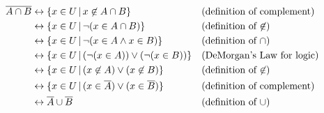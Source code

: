 \begin{solutions}
	\solution\begin{align*}
	\overline{A\cap B} &\leftrightarrow \{x\in U\,|\, x\not\in A\cap B \} &&\text{(definition of complement)}\\
	&\leftrightarrow \{x\in U\,|\, \lnot (x\in A\cap B)\} &&\text{(definition of $\not\in$)}\\
	&\leftrightarrow \{x\in U\,|\, \lnot (x\in A\wedge x\in B)\} &&\text{(definition of $\cap$)}\\
	&\leftrightarrow \{x\in U\,|\, (\lnot (x\in A))\vee (\lnot (x\in B))\} &&\text{(DeMorgan's Law for logic)}\\
	&\leftrightarrow \{x\in U\,|\, (x\not\in A)\vee (x\not\in B)\} &&\text{(definition of $\not\in$)}\\
	&\leftrightarrow \{x\in U\,|\, (x\in\overline{A})\vee (x\in\overline{B})\}&&\text{(definition of complement)}\\
	&\leftrightarrow \overline{A}\cup\overline{B}&&\text{(definition of $\cup$)}
	\end{align*}


\end{solutions}
